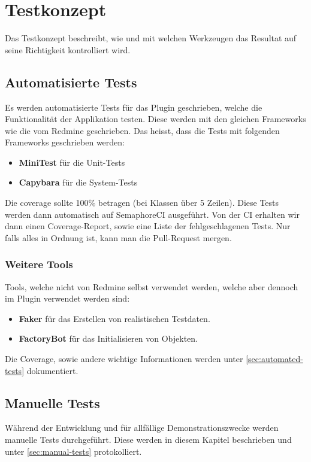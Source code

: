 \section{Testkonzept}
\label{sec:testkonzept}
Das Testkonzept beschreibt, wie und mit welchen Werkzeugen das Resultat auf seine Richtigkeit kontrolliert wird.

\begin{minipage}{\textwidth}
  \subsection{Automatisierte Tests}
  Es werden automatisierte Tests für das Plugin geschrieben, welche die Funktionalität der Applikation testen.
  Diese werden mit den gleichen Frameworks wie die vom Redmine geschrieben. Das heisst, dass die Tests mit
  folgenden Frameworks geschrieben werden:
  \begin{itemize}
    \item \textbf{MiniTest} für die Unit-Tests
    \item \textbf{Capybara} für die System-Tests
  \end{itemize}
  Die coverage sollte 100\% betragen (bei Klassen über 5 Zeilen). Diese Tests werden dann automatisch auf 
  SemaphoreCI ausgeführt. Von der CI erhalten wir dann einen Coverage-Report, sowie eine Liste der
  fehlgeschlagenen Tests. Nur falls alles in Ordnung ist, kann man die Pull-Request mergen.
\end{minipage}

\begin{minipage}{\textwidth}
  \subsubsection{Weitere Tools}
  Tools, welche nicht von Redmine selbst verwendet werden, welche aber dennoch im Plugin verwendet werden sind:
  \begin{itemize}
    \item \textbf{Faker} für das Erstellen von realistischen Testdaten.
    \item \textbf{FactoryBot} für das Initialisieren von Objekten.
  \end{itemize}
  Die Coverage, sowie andere wichtige Informationen werden unter \ref{sec:automated-tests} dokumentiert.
\end{minipage}

\subsection{Manuelle Tests}
Während der Entwicklung und für allfällige Demonstrationszwecke werden manuelle Tests durchgeführt. Diese
werden in diesem Kapitel beschrieben und unter \ref{sec:manual-tests} protokolliert.

